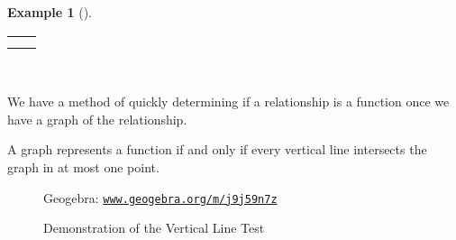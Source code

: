 \documentclass[10pt,]{book}
\newcommand{\mono}[1]{\texttt{#1}}
\theoremstyle{plain}
\theoremstyle{definition}
\theoremstyle{definition}
\theoremstyle{definition}
\newtheorem{example}[theorem]{Example}
\theoremstyle{definition}
\numberwithin{equation}{section}
\newlength{\panelmax}
\begin{document}
\begin{example}[]
{\begin{lrbox}{\panelboxAimage}
\end{lrbox}
\ifdefined\phAimage\else\newlength{\phAimage}\fi%
\setlength{\phAimage}{\ht\panelboxAimage+\dp\panelboxAimage}
\settototalheight{\phAimage}{\usebox{\panelboxAimage}}
\setlength{\panelmax}{\maxof{\panelmax}{\phAimage}}
\leavevmode%
\setlength{\tabcolsep}{0.025\linewidth}
\par\medskip\noindent
\hspace*{0.025\linewidth}%
\begin{tabular}{@{}*{2}{c}@{}}
\begin{minipage}[c][\panelmax][t]{0.5\linewidth}\usebox{\panelboxAp}\end{minipage}&
\begin{minipage}[c][\panelmax][t]{0.4\linewidth}\usebox{\panelboxAimage}\end{minipage}\tabularnewline
&
\parbox[t]{0.4\linewidth}{
}\end{tabular}\\
}%
\end{example}
\hypertarget{p-39}{}%
We have a method of quickly determining if a relationship is a function once we have a graph of the relationship.%
\begin{assemblage}\label{assemblage-2}
\hypertarget{p-40}{}%
A graph represents a function if and only if every vertical line intersects the graph in at most one point.%
\end{assemblage}
\begin{figure}
\centering
\centerline{Geogebra: \href{https://www.geogebra.org/m/j9j59n7z}{\mono{www.geogebra.org/m/j9j59n7z}}}
\caption{Demonstration of the Vertical Line Test\label{figure-2}}
\end{figure}
\end{document}
